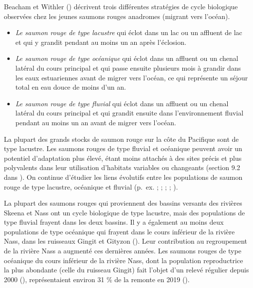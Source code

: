 \documentclass[french,11pt]{book}
\begin{document}
Beacham et Withler () décrivent trois différentes stratégies de cycle biologique observées chez les jeunes saumons rouges anadromes (migrant vers l'océan).
\begin{itemize}

\item
  \emph{Le saumon rouge de type lacustre} qui éclot dans un lac ou un affluent de lac et qui y grandit pendant au moins un an après l'éclosion.
\item
  \emph{Le saumon rouge de type océanique} qui éclot dans un affluent ou un chenal latéral du cours principal et qui passe ensuite plusieurs mois à grandir dans les eaux estuariennes avant de migrer vers l'océan, ce qui représente un séjour total en eau douce de moins d'un an.
\item
  \emph{Le saumon rouge de type fluvial} qui éclot dans un affluent ou un chenal latéral du cours principal et qui grandit ensuite dans l'environnement fluvial pendant au moins un an avant de migrer vers l'océan.
\end{itemize}
La plupart des grands stocks de saumon rouge sur la côte du Pacifique sont de type lacustre. Les saumons rouges de type fluvial et océanique peuvent avoir un potentiel d'adaptation plus élevé, étant moins attachés à des sites précis et plus polyvalents dans leur utilisation d'habitats variables ou changeants (section 9.2 dans ). On continue d'étudier les liens évolutifs entre les populations de saumon rouge de type lacustre, océanique et fluvial (p.~ex. ; ; ; ; ).

La plupart des saumons rouges qui proviennent des bassins versants des rivières Skeena et Nass ont un cycle biologique de type lacustre, mais des populations de type fluvial frayent dans les deux bassins. Il y a également au moins deux populations de type océanique qui frayent dans le cours inférieur de la rivière Nass, dans les ruisseaux Gingit et Gityzon (). Leur contribution au regroupement de la rivière Nass a augmenté ces dernières années. Les saumons rouges de type océanique du cours inférieur de la rivière Nass, dont la population reproductrice la plus abondante (celle du ruisseau Gingit) fait l'objet d'un relevé régulier depuis 2000 (), représentaient environ 31 \% de la remonte en 2019 ().
\end{document}
